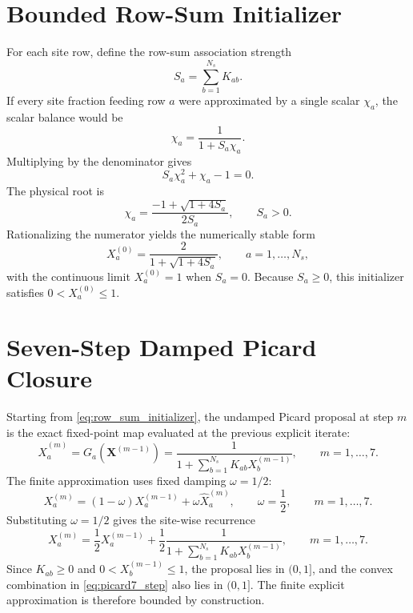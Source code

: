 \documentclass[12pt,letterpaper]{article}
\begin{document}
\section{Bounded Row-Sum Initializer}

For each site row, define the row-sum association strength
\begin{equation}
    S_a = \sum_{b=1}^{N_s}K_{ab}.
    \label{eq:row_sum_strength}
\end{equation}
If every site fraction feeding row \(a\) were approximated by a single scalar
\(\chi_a\), the scalar balance would be
\begin{equation}
    \chi_a = \frac{1}{1+S_a\chi_a}.
    \label{eq:scalar_row_sum_balance}
\end{equation}
Multiplying by the denominator gives
\begin{equation}
    S_a\chi_a^2+\chi_a-1=0 .
    \label{eq:scalar_row_sum_quadratic}
\end{equation}
The physical root is
\begin{equation}
    \chi_a =
    \frac{-1+\sqrt{1+4S_a}}{2S_a},
    \qquad S_a>0 .
    \label{eq:row_sum_root_direct}
\end{equation}
Rationalizing the numerator yields the numerically stable form
\begin{equation}
    X_a^{(0)}
    =
    \frac{2}{1+\sqrt{1+4S_a}},
    \qquad a=1,\dots,N_s ,
    \label{eq:row_sum_initializer}
\end{equation}
with the continuous limit \(X_a^{(0)}=1\) when \(S_a=0\). Because
\(S_a\ge 0\), this initializer satisfies \(0<X_a^{(0)}\le 1\).

\section{Seven-Step Damped Picard Closure}

Starting from \eqref{eq:row_sum_initializer}, the undamped Picard proposal at
step \(m\) is the exact fixed-point map evaluated at the previous explicit
iterate:
\begin{equation}
    \widehat{X}_a^{(m)}
    =
    G_a(\mathbf{X}^{(m-1)})
    =
    \frac{1}{
        1+\sum_{b=1}^{N_s}K_{ab}X_b^{(m-1)}
    },
    \qquad m=1,\dots,7 .
    \label{eq:picard_proposal}
\end{equation}
The finite approximation uses fixed damping \(\omega=1/2\):
\begin{equation}
    X_a^{(m)}
    =
    (1-\omega)X_a^{(m-1)}
    +
    \omega\widehat{X}_a^{(m)},
    \qquad \omega=\frac{1}{2},
    \qquad m=1,\dots,7 .
    \label{eq:fixed_damping_picard}
\end{equation}
Substituting \(\omega=1/2\) gives the site-wise recurrence
\begin{equation}
    X_a^{(m)}
    =
    \frac{1}{2}X_a^{(m-1)}
    +
    \frac{1}{2}
    \frac{1}{
        1+\sum_{b=1}^{N_s}K_{ab}X_b^{(m-1)}
    },
    \qquad m=1,\dots,7 .
    \label{eq:picard7_step}
\end{equation}
Since \(K_{ab}\ge 0\) and \(0<X_b^{(m-1)}\le 1\), the proposal lies in
\((0,1]\), and the convex combination in \eqref{eq:picard7_step} also lies in
\((0,1]\). The finite explicit approximation is therefore bounded by
construction.
\end{document}
